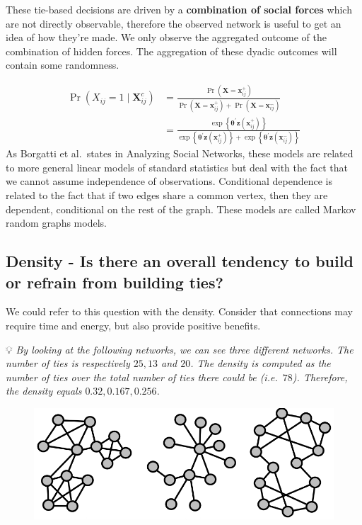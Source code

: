 \documentclass[
  notitlepage,
  onecolumn,
  openany]{book}
\begin{document}
These tie-based decisions are driven by a \textbf{combination of social forces} which are not directly observable, therefore the observed network is useful to get an idea of how they're made. We only observe the aggregated outcome of the combination of hidden forces. The aggregation of these dyadic outcomes will contain some randomness.

\[
\begin{aligned}
\operatorname{Pr}\left(X_{i j}=1 \mid \mathbf{X}_{i j}^{c}\right) &=\frac{\operatorname{Pr}\left(\mathbf{X}=\mathbf{x}_{i j}^{+}\right)}{\operatorname{Pr}\left(\mathbf{X}=\mathbf{x}_{i j}^{+}\right)+\operatorname{Pr}\left(\mathbf{X}=\mathbf{x}_{i j}^{-}\right)} \\&=\frac{\exp \left\{\boldsymbol{\theta}^{\prime} \mathbf{z}\left(\mathbf{x}_{i j}^{+}\right)\right\}}{\exp \left\{\boldsymbol{\theta}^{\prime} \mathbf{z}\left(\mathbf{x}_{i j}^{+}\right)\right\}+\exp \left\{\boldsymbol{\theta}^{\prime} \mathbf{z}\left(\mathbf{x}_{i j}^{-}\right)\right\}}
\end{aligned}
\]
As Borgatti et al.~states in Analyzing Social Networks, these models are related to more general linear models of standard statistics but deal with the fact that we cannot assume independence of observations. Conditional dependence is related to the fact that if two edges share a common vertex, then they are dependent, conditional on the rest of the graph. These models are called Markov random graphs models.

\hypertarget{density---is-there-an-overall-tendency-to-build-or-refrain-from-building-ties}{%
\subsection{Density - Is there an overall tendency to build or refrain from building ties?}\label{density---is-there-an-overall-tendency-to-build-or-refrain-from-building-ties}}

We could refer to this question with the density. Consider that connections may require time and energy, but also provide positive benefits.

💡 \emph{By looking at the following networks, we can see three different networks. The number of ties is respectively \(25, 13\) and \(20\). The density is computed as the number of ties over the total number of ties there could be (i.e.~\(78\)). Therefore, the density equals \(0.32, 0.167, 0.256\).}

\begin{figure}[h!]

{\centering \includegraphics[width=0.5\linewidth]{images/13-ERGMs/Untitled} 

}

\end{figure}
\end{document}
